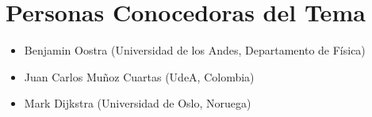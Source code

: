 \documentclass[12pt]{article}
\begin{document}
\section{Personas Conocedoras del Tema}


\begin{itemize}
	\item Benjamin Oostra (Universidad de los Andes, Departamento
          de F\'isica) 
	\item Juan Carlos Mu\~noz Cuartas (UdeA, Colombia)
	\item Mark Dijkstra (Universidad de Oslo, Noruega)
\end{itemize}
\end{document}
